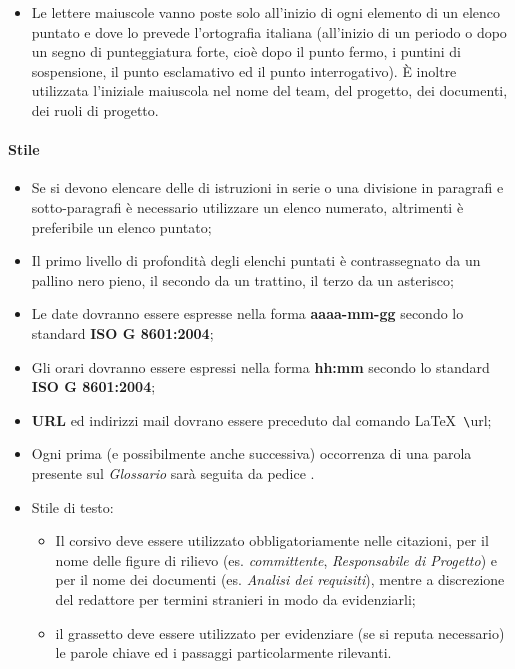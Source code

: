 \begin{itemize}

\item Le lettere maiuscole vanno poste solo all'inizio di ogni elemento di un elenco puntato e dove lo prevede l'ortografia italiana (all'inizio di un periodo o dopo un segno di punteggiatura forte, cioè dopo il punto fermo, i puntini di sospensione, il punto esclamativo ed il punto interrogativo). È inoltre utilizzata l'iniziale maiuscola nel nome del team, del progetto, dei documenti, dei ruoli di progetto.


\end{itemize}

\paragraph{Stile}
\begin{itemize}
\item Se si devono elencare delle di istruzioni in serie o una divisione in paragrafi e sotto-paragrafi è necessario utilizzare un elenco numerato, altrimenti è preferibile un elenco puntato;

\item Il primo livello di profondità degli elenchi puntati è contrassegnato da un pallino nero pieno, il secondo da un trattino, il terzo da un asterisco;

\item Le date dovranno essere espresse nella forma \textbf{aaaa-mm-gg} secondo lo standard  \textbf{ISO G 8601:2004};

\item Gli orari dovranno essere espressi nella forma \textbf{hh:mm} secondo lo standard \textbf{ISO G 8601:2004};

\item \textbf{URL} ed indirizzi mail dovrano essere preceduto dal comando \LaTeX \verb+ \+url;

\item Ogni prima (e possibilmente anche successiva) occorrenza di una parola presente sul \textit{Glossario} sarà seguita da pedice .

\item Stile di testo:

\begin{itemize}

\item Il corsivo deve essere utilizzato obbligatoriamente nelle citazioni, per il nome delle figure di rilievo (es. \textit{committente}, \textit{Responsabile di Progetto}) e per il nome dei documenti (es. \textit{Analisi dei requisiti}), mentre a discrezione del redattore per termini stranieri in modo da evidenziarli;

\item il grassetto deve essere utilizzato per evidenziare (se si reputa necessario) le parole chiave ed i passaggi particolarmente rilevanti.

\end{itemize}

\end{itemize}
